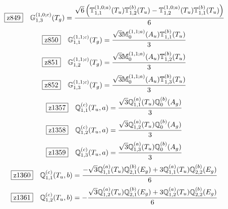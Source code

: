 \documentclass[fleqn,10pt,landscape]{jsarticle}
\begin{document}
\begin{dmath*}
\hspace*{3mm}\fbox{z849}\quad \mathbb{G}_{1,3}^{(1,0;c)}(T_{g})=\frac{\sqrt{6} \left(\mathbb{T}_{1,1}^{(1,0;a)}(T_{u}) \mathbb{T}_{1,2}^{(b)}(T_{u}) - \mathbb{T}_{1,2}^{(1,0;a)}(T_{u}) \mathbb{T}_{1,1}^{(b)}(T_{u})\right)}{6}
\end{dmath*}
\begin{dmath*}
\hspace*{3mm}\fbox{z850}\quad \mathbb{G}_{1,1}^{(1,1;c)}(T_{g})=\frac{\sqrt{3} \mathbb{M}_{0}^{(1,1;a)}(A_{u}) \mathbb{T}_{1,1}^{(b)}(T_{u})}{3}
\end{dmath*}
\begin{dmath*}
\hspace*{3mm}\fbox{z851}\quad \mathbb{G}_{1,2}^{(1,1;c)}(T_{g})=\frac{\sqrt{3} \mathbb{M}_{0}^{(1,1;a)}(A_{u}) \mathbb{T}_{1,2}^{(b)}(T_{u})}{3}
\end{dmath*}
\begin{dmath*}
\hspace*{3mm}\fbox{z852}\quad \mathbb{G}_{1,3}^{(1,1;c)}(T_{g})=\frac{\sqrt{3} \mathbb{M}_{0}^{(1,1;a)}(A_{u}) \mathbb{T}_{1,3}^{(b)}(T_{u})}{3}
\end{dmath*}
\begin{dmath*}
\hspace*{3mm}\fbox{z1357}\quad \mathbb{Q}_{1,1}^{(c)}(T_{u},a)=\frac{\sqrt{3} \mathbb{Q}_{1,1}^{(a)}(T_{u}) \mathbb{Q}_{0}^{(b)}(A_{g})}{3}
\end{dmath*}
\begin{dmath*}
\hspace*{3mm}\fbox{z1358}\quad \mathbb{Q}_{1,2}^{(c)}(T_{u},a)=\frac{\sqrt{3} \mathbb{Q}_{1,2}^{(a)}(T_{u}) \mathbb{Q}_{0}^{(b)}(A_{g})}{3}
\end{dmath*}
\begin{dmath*}
\hspace*{3mm}\fbox{z1359}\quad \mathbb{Q}_{1,3}^{(c)}(T_{u},a)=\frac{\sqrt{3} \mathbb{Q}_{1,3}^{(a)}(T_{u}) \mathbb{Q}_{0}^{(b)}(A_{g})}{3}
\end{dmath*}
\begin{dmath*}
\hspace*{3mm}\fbox{z1360}\quad \mathbb{Q}_{1,1}^{(c)}(T_{u},b)=\frac{- \sqrt{3} \mathbb{Q}_{1,1}^{(a)}(T_{u}) \mathbb{Q}_{2,1}^{(b)}(E_{g}) + 3 \mathbb{Q}_{1,1}^{(a)}(T_{u}) \mathbb{Q}_{2,2}^{(b)}(E_{g})}{6}
\end{dmath*}
\begin{dmath*}
\hspace*{3mm}\fbox{z1361}\quad \mathbb{Q}_{1,2}^{(c)}(T_{u},b)=- \frac{\sqrt{3} \mathbb{Q}_{1,2}^{(a)}(T_{u}) \mathbb{Q}_{2,1}^{(b)}(E_{g}) + 3 \mathbb{Q}_{1,2}^{(a)}(T_{u}) \mathbb{Q}_{2,2}^{(b)}(E_{g})}{6}
\end{dmath*}
\end{document}
